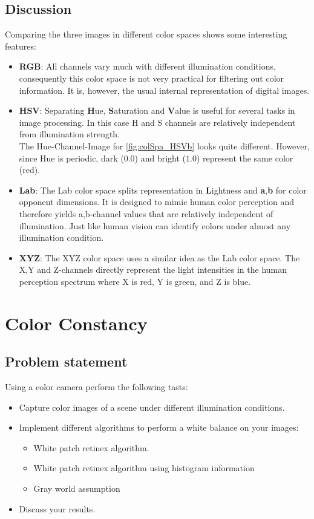 \documentclass[
a4paper,     %
11pt         %
]{scrartcl}  %
\begin{document}
\clearpage
\subsection{Discussion}
Comparing the three images in different color spaces shows some interesting features:
\begin{itemize}
 \item \textbf{RGB}: All channels vary much with different illumination conditions, consequently this color space is not very practical for filtering out color information. It is, however, the usual internal representation of digital images.
 \item \textbf{HSV}: Separating \textbf Hue, \textbf Saturation and \textbf Value is useful for several tasks in image processing. In this case H and S channels are relatively independent from illumination strength.\\
 The Hue-Channel-Image for \cref{fig:colSpa_HSVb} looks quite different. However, since Hue is periodic, dark ($0.0$) and bright ($1.0$) represent the same color (red).
 \item \textbf{Lab}: The Lab color space splits representation in \textbf Lightness and \textbf{a},\textbf{b} for color opponent dimensions. It is designed to mimic human color perception and therefore yields a,b-channel values that are relatively independent of illumination. Just like human vision can identify colors under almost any illumination condition.
 \item \textbf{XYZ}: The XYZ color space uses a similar idea as the Lab color space. The X,Y and Z-channels directly represent the light intensities in the human perception spectrum where X is red, Y is green, and Z is blue.
\end{itemize}

\newpage
\FloatBarrier
\section{Color Constancy}

\subsection{Problem statement}

Using a color camera perform the following tasts:
\begin{itemize}
 \item Capture color images of a scene under different illumination conditions.
 \item Implement different algorithms to perform a white balance on your images:
 \begin{itemize}
  \item White patch retinex algorithm.
  \item White patch retinex algorithm using histogram information
  \item Gray world assumption
 \end{itemize}
 \item Discuss your results.
\end{itemize}
\end{document}
